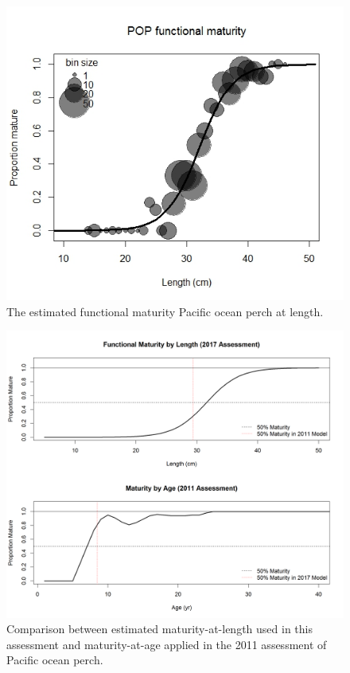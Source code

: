 \documentclass[12pt,]{article}
\begin{document}
\begin{figure}
\centering
\includegraphics{Figures/Functional_Maturity.png}
\caption{The estimated functional maturity Pacific ocean perch at
length. \label{fig:mat}}
\end{figure}

\begin{figure}
\centering
\includegraphics{Figures/Maturity_Comparison.png}
\caption{Comparison between estimated maturity-at-length used in this
assessment and maturity-at-age applied in the 2011 assessment of Pacific
ocean perch. \label{fig:mat_compare}}
\end{figure}
\end{document}

